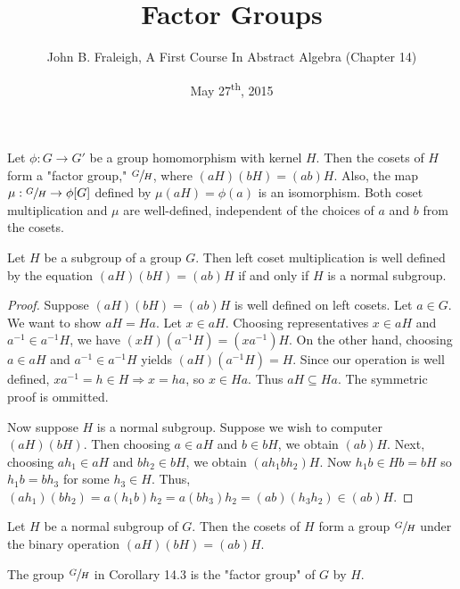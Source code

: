 \documentclass[a4paper,11pt]{article}
\title{Factor Groups}
\author{John B. Fraleigh, A First Course In Abstract Algebra (Chapter 14)}
\date{May 27\textsuperscript{th}, 2015}
\begin{document}
\maketitle
{}

\begin{outline}

    Let \(\phi: G \rightarrow G'\) be a group homomorphism with kernel \(H\). Then the cosets of \(H\) form a 
    "factor group," \(\sfrac{G}{H}\), where \((aH)(bH) = (ab)H\). Also, the map \(\mu: \sfrac{G}{H} \rightarrow
    \phi[G]\) defined by \(\mu(aH) = \phi(a)\) is an isomorphism. Both coset multiplication and \(\mu\) are 
    well-defined, independent of the choices of \(a\) and \(b\) from the cosets.
    
    Let \(H\) be a subgroup of a group \(G\). Then left coset multiplication is well defined by the
    equation \((aH)(bH) = (ab)H\) if and only if \(H\) is a normal subgroup.
    
    \begin{proof}
      \forward
        Suppose \((aH)(bH) = (ab)H\) is well defined on left cosets. Let \(a \in G\). We want to show
        \(aH = Ha\). Let \(x \in aH\). Choosing representatives \(x \in aH\) and \(a^{-1} \in a^{-1}H\), we 
        have \((xH)(a^{-1}H) = (xa^{-1})H\). On the other hand, choosing \(a \in aH\) and \(a^{-1} \in 
        a^{-1}H\) yields \((aH)(a^{-1}H) = H\). Since our operation is well defined, \(xa^{-1} = h \in H 
        \Rightarrow x = ha\), so \(x \in Ha\). Thus \(aH \subseteq Ha\). The symmetric proof is ommitted.
        
      \backward
        Now suppose \(H\) is a normal subgroup. Suppose we wish to computer \((aH)(bH)\). Then choosing
        \(a \in aH\) and \(b \in bH\), we obtain \((ab)H\). Next, choosing \(ah_{1} \in aH\) and \(bh_{2} 
        \in bH\), we obtain \((ah_{1}bh_{2})H\). Now \(h_{1}b \in Hb = bH\) so \(h_{1}b = bh_{3}\) for 
        some \(h_{3} \in H\). Thus, \((ah_{1})(bh_{2}) = a(h_{1}b)h_{2} = a(bh_{3})h_{2} = (ab)(h_{3}h_{2}) 
        \in (ab)H\).
    \end{proof}
    
    Let \(H\) be a normal subgroup of \(G\). Then the cosets of \(H\) form a group \(\sfrac{G}{H}\)
    under the binary operation \((aH)(bH) = (ab)H\).
    
    The group \(\sfrac{G}{H}\) in Corollary 14.3 is the "factor group" of \(G\) by \(H\).
    

\end{outline}
\end{document}

